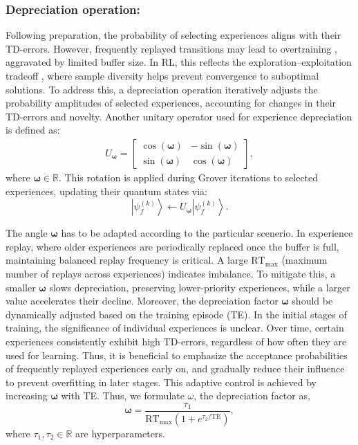 \documentclass[journal]{IEEEtran}
\begin{document}
\subsubsection{Depreciation operation:}
Following preparation, the probability of selecting experiences aligns with their TD-errors. However, frequently replayed transitions may lead to overtraining \cite{de2015importance}, aggravated by limited buffer size. In RL, this reflects the exploration–exploitation tradeoff \cite{ishii2002control}, where sample diversity helps prevent convergence to suboptimal solutions. To address this, a depreciation operation iteratively adjusts the probability amplitudes of selected experiences, accounting for changes in their TD-errors and novelty. Another unitary operator used for experience depreciation is defined as:
\begin{align}
U_{\boldsymbol \omega } = \begin{bmatrix}
\cos(\boldsymbol \omega) & -\sin(\boldsymbol \omega) \\
\sin(\boldsymbol \omega) & \cos(\boldsymbol \omega)
\end{bmatrix},
\label{unitary_oper_w}
\end{align}
where $\boldsymbol{\omega} \in \mathbb{R}$. This rotation is applied during Grover iterations to selected experiences, updating their quantum states via:
\begin{equation}
\left |{\psi ^{(k)}_{f}}\right \rangle \leftarrow U_{\boldsymbol \omega }\left |{\psi ^{(k)}_{f}}\right \rangle.
\label{final_qubit_after_depreciation}
\end{equation}

The angle $\boldsymbol{\omega}$ has to be adapted according to the particular scenerio. In experience replay, where older experiences are periodically replaced once the buffer is full, maintaining balanced replay frequency is critical. A large $\text{RT}_{\max}$ (maximum number of replays across experiences) indicates imbalance. To mitigate this, a smaller $\boldsymbol{\omega}$ slows depreciation, preserving lower-priority experiences, while a larger value accelerates their decline.
Moreover, the depreciation factor $\boldsymbol{\omega}$ should be dynamically adjusted based on the training episode (TE). In the initial stages of training, the significance of individual experiences is unclear. Over time, certain experiences consistently exhibit high TD-errors, regardless of how often they are used for learning. Thus, it is beneficial to emphasize  the acceptance probabilities of frequently replayed experiences early on, and gradually reduce their influence to prevent overfitting in later stages. This adaptive control is achieved by increasing $\boldsymbol{\omega}$ with TE. Thus, we formulate $\omega$, the depreciation factor as,
\begin{equation}
\boldsymbol \omega = \frac{\tau_1}{\mathrm{RT}_{\max} \left(1 + e^{\tau_2 / \mathrm{TE}}\right)},
\label{depreciation_factor}
\end{equation}
where $\tau_1, \tau_2 \in \mathbb{R}$ are hyperparameters.
\end{document}
